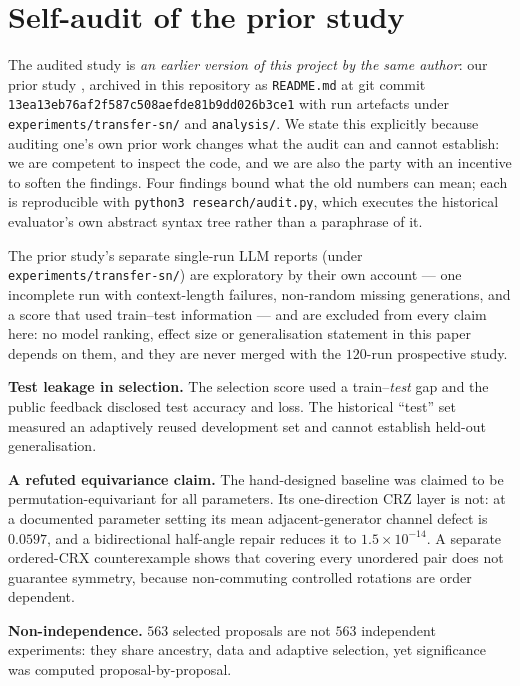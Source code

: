 \documentclass[11pt]{article}
\begin{document}
\section{Self-audit of the prior study}
\label{sec:audit}

The audited study is \emph{an earlier version of this project by the same author}:
our prior study \cite{ho2026prior}, archived in this repository as \texttt{README.md} at git commit
\texttt{13ea13eb76af2f587c508aefde81b9dd026b3ce1} with run artefacts under
\texttt{experiments/transfer-sn/} and \texttt{analysis/}. We state this explicitly because
auditing one's own prior work changes what the audit can and cannot establish: we are
competent to inspect the code, and we are also the party with an incentive to soften the
findings. Four findings bound what the old numbers can mean; each is reproducible with
\texttt{python3 research/audit.py}, which executes the historical evaluator's own
abstract syntax tree rather than a paraphrase of it.

The prior study's separate single-run LLM reports (under \texttt{experiments/transfer-sn/})
are exploratory by their own account --- one incomplete run with context-length failures,
non-random missing generations, and a score that used train--test information --- and are
excluded from every claim here: no model ranking, effect size or generalisation statement in
this paper depends on them, and they are never merged with the $120$-run prospective study.

\textbf{Test leakage in selection.} The selection score used a train--\emph{test} gap and
the public feedback disclosed test accuracy and loss. The historical ``test'' set measured
an adaptively reused development set and cannot establish held-out generalisation.

\textbf{A refuted equivariance claim.} The hand-designed baseline was claimed to be
permutation-equivariant for all parameters. Its one-direction CRZ layer is not: at a
documented parameter setting its mean adjacent-generator channel defect is $0.0597$, and a
bidirectional half-angle repair reduces it to $1.5\times10^{-14}$. A separate ordered-CRX
counterexample shows that covering every unordered pair does not guarantee symmetry,
because non-commuting controlled rotations are order dependent.

\textbf{Non-independence.} $563$ selected proposals are not $563$ independent experiments:
they share ancestry, data and adaptive selection, yet significance was computed
proposal-by-proposal.
\end{document}
